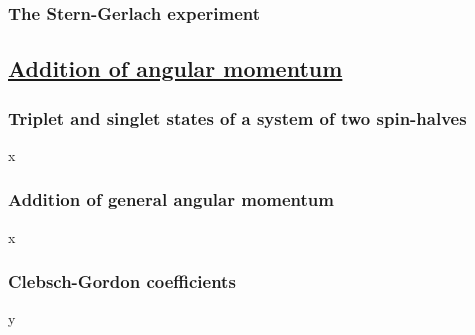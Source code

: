\subsubsection{The Stern-Gerlach experiment}

\subsection{\underline{Addition of angular momentum}}

\subsubsection{Triplet and singlet states of a system of two spin-halves}
x

\subsubsection{Addition of general angular momentum}
x

\subsubsection{Clebsch-Gordon coefficients}
y

